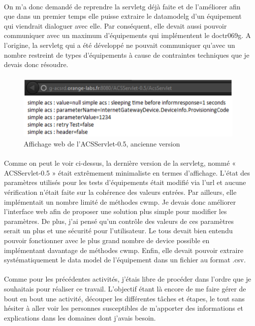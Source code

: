 \documentclass[12pt,a4paper]{report}
\begin{document}
\paragraph*{}On m’a donc demandé de reprendre la \gls{servletg} déjà faite et de l’améliorer afin que dans un premier temps elle puisse extraire le \gls{datamodelg} d’un équipement qui viendrait dialoguer avec elle. Par conséquent, elle devait aussi pouvoir communiquer avec un maximum d'équipements qui implémentent le \gls{doctr069g}. A l’origine, la \gls{servletg} qui a été développé ne pouvait communiquer qu’avec un nombre restreint de types d'équipements à cause de contraintes techniques que je devais donc résoudre.
\paragraph*{}
\begin{figure}[!ht]
    \center
    \includegraphics[scale=0.9]{./img/acs_servlet_05.png}
    \caption{Affichage web de l’ACSServlet-0.5, ancienne version}
\end{figure}
\paragraph*{}Comme on peut le voir ci-dessus, la dernière version de la \gls{servletg}, nommé « ACSServlet-0.5 » était extrêmement minimaliste en termes d'affichage. L'état des paramètres utilisés pour les tests d'équipements était modifié via l’url et aucune vérification n’était faite sur la cohérence des valeurs entrées. Par ailleurs, elle implémentait un nombre limité de méthodes \gls{cwmp}. Je devais donc améliorer l’interface web afin de proposer une solution plus simple pour modifier les paramètres. De plus, j’ai pensé qu’un contrôle des valeurs de ces paramètres serait un plus et une sécurité pour l’utilisateur. Le tous devait bien entendu pouvoir fonctionner avec le plus grand nombre de device possible en implémentant davantage de méthodes \gls{cwmp}. Enfin, elle devait pouvoir extraire systématiquement le data model de l’équipement dans un fichier au format .csv.
\paragraph*{}Comme pour les précédentes activités, j’étais libre de procéder dans l’ordre que je souhaitais pour réaliser ce travail. L’objectif étant là encore de me faire gérer de bout en bout une activité, découper les différentes tâches et étapes, le tout sans hésiter à aller voir les personnes susceptibles de m’apporter des informations et explications dans les domaines dont j’avais besoin.
\end{document}
